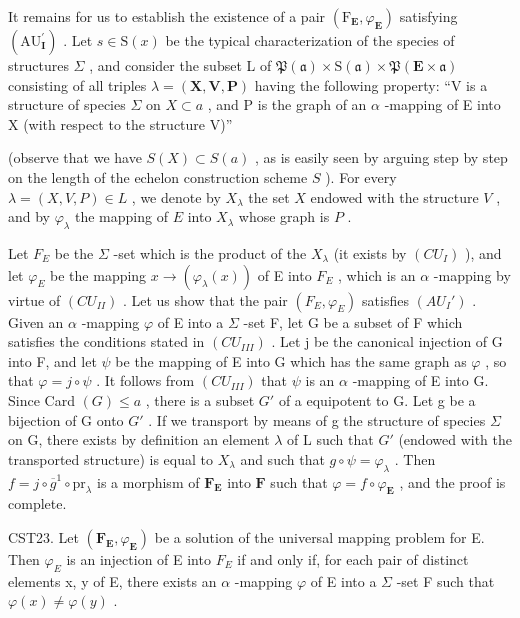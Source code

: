 It remains for us to establish the existence of a pair \((\mathrm{F}_{\mathbf{E}}, \varphi_{\mathbf{E}})\) satisfying \((\mathrm{AU}_{\mathbf{I}}^{\prime})\) . Let \(s \in \mathrm{S}(x)\) be the typical characterization of the species of structures \(\Sigma\) , and consider the subset L of \(\mathfrak{P}(\mathfrak{a}) \times \mathrm{S}(\mathfrak{a}) \times \mathfrak{P}(\mathbf{E} \times \mathfrak{a})\) consisting of all triples \(\lambda = (\mathbf{X}, \mathbf{V}, \mathbf{P})\) having the following property: ``V is a structure of species \(\Sigma\) on \(X \subset a\) , and P is the graph of an \(\alpha\) -mapping of E into X (with respect to the structure V)''

(observe that we have \(S(X) \subset S(a)\) , as is easily seen by arguing step by step on the length of the echelon construction scheme \(S\) ). For every \(\lambda = (X, V, P) \in L\) , we denote by \(X_{\lambda}\) the set \(X\) endowed with the structure \(V\) , and by \(\varphi_{\lambda}\) the mapping of \(E\) into \(X_{\lambda}\) whose graph is \(P\) .

Let \(F_{E}\) be the \(\Sigma\) -set which is the product of the \(X_{\lambda}\) (it exists by \((CU_{I})\) ), and let \(\varphi_{E}\) be the mapping \(x \to (\varphi_{\lambda}(x))\) of E into \(F_{E}\) , which is an \(\alpha\) -mapping by virtue of \((CU_{II})\) . Let us show that the pair \((F_{E}, \varphi_{E})\) satisfies \((AU_{I}')\) . Given an \(\alpha\) -mapping \(\varphi\) of E into a \(\Sigma\) -set F, let G be a subset of F which satisfies the conditions stated in \((CU_{III})\) . Let j be the canonical injection of G into F, and let \(\psi\) be the mapping of E into G which has the same graph as \(\varphi\) , so that \(\varphi = j \circ \psi\) . It follows from \((CU_{III})\) that \(\psi\) is an \(\alpha\) -mapping of E into G. Since Card \((G) \leqslant a\) , there is a subset \(G'\) of a equipotent to G. Let g be a bijection of G onto \(G'\) . If we transport by means of g the structure of species \(\Sigma\) on G, there exists by definition an element \(\lambda\) of L such that \(G'\) (endowed with the transported structure) is equal to \(X_{\lambda}\) and such that \(g \circ \psi = \varphi_{\lambda}\) . Then \(f = j \circ \overline{g}^1 \circ \mathrm{pr}_{\lambda}\) is a morphism of \(\mathbf{F}_{\mathbf{E}}\) into \(\mathbf{F}\) such that \(\varphi = f \circ \varphi_{\mathbf{E}}\) , and the proof is complete.

CST23. Let \((\mathbf{F}_{\mathbf{E}}, \varphi_{\mathbf{E}})\) be a solution of the universal mapping problem for E. Then \(\varphi_{E}\) is an injection of E into \(F_{E}\) if and only if, for each pair of distinct elements x, y of E, there exists an \(\alpha\) -mapping \(\varphi\) of E into a \(\Sigma\) -set F such that \(\varphi(x) \neq \varphi(y)\) .

